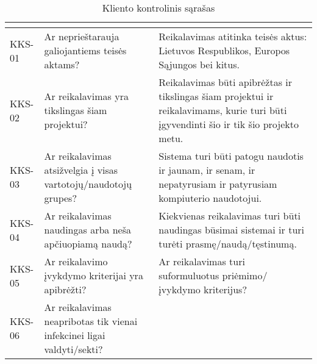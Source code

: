 \documentclass{VUMIFPSkursinis}
\begin{document}
\begin{center}

	\begin{longtable}{|C{2cm}|L{5cm}|L{8cm}|}

		\caption{Kliento kontrolinis sąrašas}
		\label{table:KKS}

		\\ \hline
		                                              &
		                                  &
		\\ \hline
		KKS-01                                                                                       &
		Ar neprieštarauja galiojantiems teisės aktams?                                               &
		Reikalavimas atitinka teisės aktus: Lietuvos Respublikos, Europos Sąjungos bei kitus.
		\\ \hline
		KKS-02                                                                                       &
		Ar reikalavimas yra tikslingas šiam projektui?                                               &
		Reikalavimas būti apibrėžtas ir tikslingas šiam projektui ir reikalavimams, kurie turi būti įgyvendinti šio ir tik šio projekto metu.
		\\ \hline
		KKS-03                                                                                       &
		Ar reikalavimas atsižvelgia į visas vartotojų/naudotojų grupes?                              &
		Sistema turi būti patogu naudotis ir jaunam, ir senam, ir nepatyrusiam ir patyrusiam kompiuterio naudotojui.
		\\ \hline
		KKS-04                                                                                       &
		Ar reikalavimas naudingas arba neša apčiuopiamą naudą?                                       &
		Kiekvienas reikalavimas turi būti naudingas būsimai sistemai ir turi turėti prasmę/naudą/tęstinumą.
		\\ \hline
		KKS-05                                                                                       &
		Ar reikalavimo įvykdymo kriterijai yra apibrėžti?                                            &
		Ar reikalavimas turi suformuluotus priėmimo/įvykdymo kriterijus?
		\\ \hline
		KKS-06                                                                                       &
		Ar reikalavimas neapribotas tik vienai infekcinei ligai valdyti/sekti?                       &

\end{longtable}
\end{center}
\end{document}
